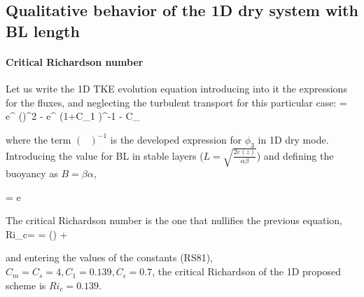 \subsection{Qualitative behavior of the 1D dry system with BL length}
\paragraph{Critical Richardson number}
Let us write the 1D TKE evolution equation introducing into it the expressions
for the fluxes, and neglecting the turbulent transport for this particular case:
\be
{}=
 e^{} ()^2
- e^{}
 \left(1+C_1   
 \right)^{-1}
- C_{\epsilon} 
\ee

\noindent
where the term $(\,\,\,\,)^{-1}$ is the developed expression for $\phi_3$ in
1D dry mode. Introducing the value for BL in stable layers
($ L= \sqrt{\frac{2 e(z)}{\alpha \beta}}$) and defining the buoyancy as
$B=\beta \alpha$,

\be
{}= e 
\ee

The critical Richardson number is the one that nullifies the previous equation,
\be
Ri_c= =
       {  () + }
\ee

\noindent
and entering the values of the constants (RS81), $C_m=C_s=4, C_1=0.139,
C_{\epsilon}=0.7$, the critical Richardson of the 1D proposed scheme is
{\bf $Ri_c= 0.139$}.


